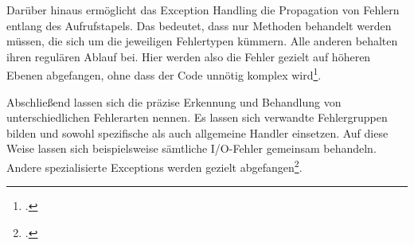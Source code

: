 Darüber hinaus ermöglicht das Exception Handling die Propagation von Fehlern entlang des Aufrufstapels. Das bedeutet, dass nur Methoden behandelt werden müssen, die sich um die jeweiligen Fehlertypen kümmern. Alle anderen behalten ihren regulären Ablauf bei. Hier werden also die Fehler gezielt auf höheren Ebenen abgefangen, ohne dass der Code unnötig komplex wird\footcite[Vgl.][]{10_AOE}.
 
Abschließend lassen sich die präzise Erkennung und Behandlung von unterschiedlichen Fehlerarten nennen. Es lassen sich verwandte Fehlergruppen bilden und sowohl spezifische als auch allgemeine Handler einsetzen. Auf diese Weise lassen sich beispielsweise sämtliche I/O-Fehler gemeinsam behandeln. Andere spezialisierte Exceptions werden gezielt abgefangen\footcite[Vgl.][]{10_AOE}.
